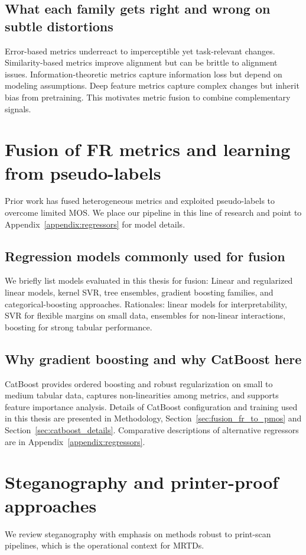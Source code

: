 \subsection{What each family gets right and wrong on subtle distortions}\label{sec:family_tradeoffs}
Error-based metrics underreact to imperceptible yet task-relevant changes. Similarity-based metrics improve alignment but can be brittle to alignment issues. Information-theoretic metrics capture information loss but depend on modeling assumptions. Deep feature metrics capture complex changes but inherit bias from pretraining. This motivates metric fusion to combine complementary signals.

\section{Fusion of FR metrics and learning from pseudo-labels}\label{sec:fusion_related}
Prior work has fused heterogeneous metrics and exploited pseudo-labels to overcome limited MOS. We place our pipeline in this line of research and point to Appendix~\ref{appendix:regressors} for model details.

\subsection{Regression models commonly used for fusion}\label{sec:regression_models_overview}
We briefly list models evaluated in this thesis for fusion:
Linear and regularized linear models, kernel SVR, tree ensembles, gradient boosting families, and categorical-boosting approaches.
Rationales: linear models for interpretability, SVR for flexible margins on small data, ensembles for non-linear interactions, boosting for strong tabular performance.

\subsection{Why gradient boosting and why CatBoost here}\label{sec:why_catboost}
CatBoost provides ordered boosting and robust regularization on small to medium tabular data, captures non-linearities among metrics, and supports feature importance analysis. Details of CatBoost configuration and training used in this thesis are presented in Methodology, Section~\ref{sec:fusion_fr_to_pmos} and Section~\ref{sec:catboost_details}. Comparative descriptions of alternative regressors are in Appendix~\ref{appendix:regressors}.

\section{Steganography and printer-proof approaches}\label{sec:steganography_related}
We review steganography with emphasis on methods robust to print-scan pipelines, which is the operational context for MRTDs.

